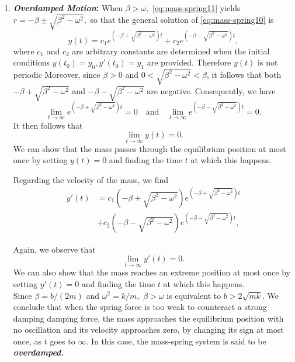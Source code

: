 \begin{enumerate}[leftmargin=1.5em,label = (\arabic*)]
	
	\item\label{item:damping3}\textbf{\textit{Overdamped Motion}:}  
	When $\beta >\omega,$  \eqref{eq:mass-spring11} yields  $r = - \beta \pm  \sqrt{\beta^2- \omega^2},$ so that the general solution of \eqref{eq:mass-spring10} is
	\[y(t) =  c_1e^{(-\beta + \sqrt{\beta^2- \omega^2})t}+ c_2e^{(-\beta - \sqrt{\beta^2- \omega^2})t},\] where $c_1$ and $c_2$ are arbitrary constants are determined when the initial conditions $y(t_0) = y_0,  y'(t_0) = y_1$ are provided.  
	Therefore $y(t)$ is not periodic   Moreover, 
	since $\beta >0$ and \(0<\sqrt{\beta^2- \omega^2} < \beta\),  it follows that both 
	\(-\beta + \sqrt{\beta^2- \omega^2}\) and 	\(-\beta - \sqrt{\beta^2- \omega^2}\) are negative.
	Consequently,
	  we have  \[\lim\limits_{t\to\infty} e^{(-\beta + \sqrt{\beta^2- \omega^2})t}=0 \quad \mbox{and} \quad \lim\limits_{t\to\infty}e^{(-\beta - \sqrt{\beta^2- \omega^2})t}=0.\]
	It then follows that \[\lim\limits_{t\to\infty} y(t)=0.\]  We can show that the mass passes through the equilibrium position at most once by setting $y(t) = 0$ and finding the time $t$ at which this happens.

Regarding the velocity of the mass, we find
	\[\begin{split}
		y'(t) &=  c_1 (-\beta + \sqrt{\beta^2- \omega^2})e^{(-\beta + \sqrt{\beta^2- \omega^2})t}\\
		&+ c_2(-\beta - \sqrt{\beta^2- \omega^2}) e^{(-\beta - \sqrt{\beta^2- \omega^2})t},
	\end{split}
	\]

	Again, we observe that
	\[\lim\limits_{t\to\infty} y'(t)=0.\]  
   We can also show that the mass reaches  an extreme position  at most once by setting $y'(t) = 0$ and finding the time $t$ at which this happens.\\
   
	Since $\beta = b/(2m)$ and $\omega^2 = k/m,$ $\beta > \omega$ is equivalent to $b> 2\sqrt{mk}.$ 
	We conclude that when the spring force is too weak to counteract a strong damping damping force, the mass  approaches the equilibrium position with no oscillation and its velocity approaches zero, by changing its sign at most once, as $t$ goes to $\infty$.  In this case, the mass-spring system is said to be \textbf{\textit{overdamped.}}
	

\end{enumerate}
